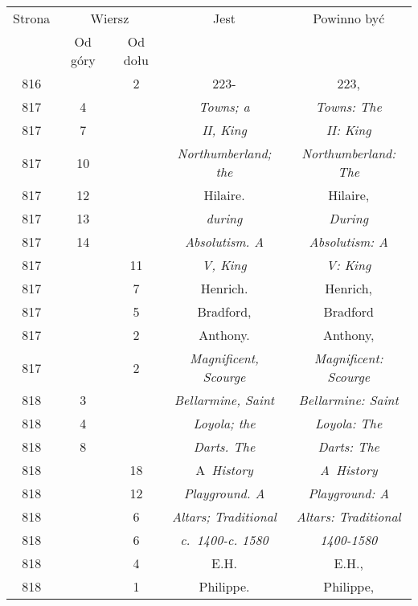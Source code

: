 \documentclass[a4paper,11pt]{article}
\begin{document}
\begin{center}
  \newpage

  \begin{tabular}{|c|c|c|c|c|}
    \hline
    Strona & \multicolumn{2}{c|}{Wiersz} & Jest
                              & Powinno być \\ \cline{2-3}
    & Od góry & Od dołu & & \\
    \hline
    816 & & \hphantom{0}2 & 223- & 223, \\
    817 & \hphantom{0}4 & & \textit{Towns; a} & \textit{Towns: The} \\
    817 & \hphantom{0}7 & & \textit{II, King} & \textit{II: King} \\
    817 & 10 & & \textit{Northumberland; the}
           & \textit{Northumberland: The} \\
    817 & 12 & & Hilaire. & Hilaire, \\
    817 & 13 & & \textit{during} & \textit{During} \\
    817 & 14 & & \textit{Absolutism. A} & \textit{Absolutism: A} \\
    817 & & 11 & \textit{V, King} & \textit{V: King} \\
    817 & & \hphantom{0}7 & Henrich. & Henrich, \\
    817 & & \hphantom{0}5 & Bradford, & Bradford \\
    817 & & \hphantom{0}2 & Anthony. & Anthony, \\
    817 & & \hphantom{0}2 & \textit{Magnificent, Scourge}
    & \textit{Magnificent: Scourge} \\
    818 & \hphantom{0}3 & & \textit{Bellarmine, Saint}
    & \textit{Bellarmine: Saint} \\
    818 & \hphantom{0}4 & & \textit{Loyola; the} & \textit{Loyola: The} \\
    818 & \hphantom{0}8 & & \textit{Darts. The} & \textit{Darts: The} \\
    818 & & 18 & A~\textit{History} & \textit{A~History} \\
    818 & & 12 & \textit{Playground. A} & \textit{Playground: A} \\
    818 & & \hphantom{0}6 & \textit{Altars; Traditional}
    & \textit{Altars: Traditional} \\
    818 & & \hphantom{0}6 & \textit{c.~1400-c. 1580} & \textit{1400-1580} \\
    818 & & \hphantom{0}4 & E.H. & E.H., \\
    818 & & \hphantom{0}1 & Philippe. & Philippe, \\

\end{tabular}
\end{center}
\end{document}
